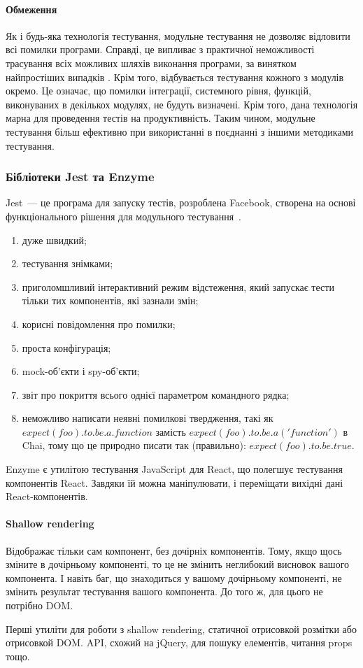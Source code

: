 \paragraph{Обмеження}

Як і будь-яка технологія тестування, модульне тестування не дозволяє відловити всі помилки програми. Справді, це випливає з практичної неможливості трасування всіх можливих шляхів виконання програми, за винятком найпростіших випадків \cite{бородіна2018selenium}. Крім того, відбувається тестування кожного з модулів окремо. Це означає, що помилки інтеграції, системного рівня, функцій, виконуваних в декількох модулях, не будуть визначені. Крім того, дана технологія марна для проведення тестів на продуктивність. Таким чином, модульне тестування більш ефективно при використанні в поєднанні з іншими методиками тестування.

\subsubsection{Бібліотеки Jest та Enzyme}

Jest~--- це програма для запуску тестів, розроблена Facebook, створена на основі функціонального рішення для модульного тестування~\cite{9781680506464}.

\begin{enumerate}
    \item дуже швидкий;
    \item тестування знімками;
    \item приголомшливий інтерактивний режим відстеження, який запускає тести тільки тих компонентів, які зазнали змін;
    \item корисні повідомлення про помилки;
    \item проста конфігурація;
    \item mock-об'єкти і spy-об'єкти;
    \item звіт про покриття всього однієї параметром командного рядка;
    \item неможливо написати неявні помилкові твердження, такі як $expect(foo).to.be.a.function$ замість $expect(foo). to.be.a( 'function')$ в Chai, тому що це природно писати так (правильно): $expect(foo).to.be.true.$
\end{enumerate}

Enzyme є утилітою тестування JavaScript для React, що полегшує тестування компонентів React. Завдяки їй можна маніпулювати, і переміщати вихідні дані React-компонентів.

\paragraph{Shallow rendering}

Відображає тільки сам компонент, без дочірніх компонентів. Тому, якщо щось зміните в дочірньому компоненті, то це не змінить неглибокий висновок вашого компонента. І навіть баг, що знаходиться у вашому дочірньому компоненті, не змінить результат тестування вашого компонента. До того ж, для цього не потрібно DOM.

Перші утиліти для роботи з shallow rendering, статичної отрисовкой розмітки або отрисовкой DOM.
API, схожий на jQuery, для пошуку елементів, читання props тощо.
